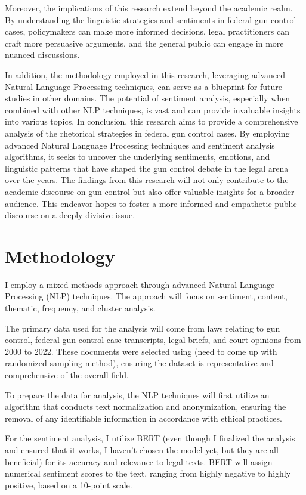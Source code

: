\documentclass[conference]{IEEEtran}
\begin{document}
Moreover, the implications of this research extend beyond the academic realm. By understanding the linguistic strategies and sentiments in federal gun control cases, policymakers can make more informed decisions, legal practitioners can craft more persuasive arguments, and the general public can engage in more nuanced discussions.

In addition, the methodology employed in this research, leveraging advanced Natural Language Processing techniques, can serve as a blueprint for future studies in other domains. The potential of sentiment analysis, especially when combined with other NLP techniques, is vast and can provide invaluable insights into various topics. In conclusion, this research aims to provide a comprehensive analysis of the rhetorical strategies in federal gun control cases. By employing advanced Natural Language Processing techniques and sentiment analysis algorithms, it seeks to uncover the underlying sentiments, emotions, and linguistic patterns that have shaped the gun control debate in the legal arena over the years. The findings from this research will not only contribute to the academic discourse on gun control but also offer valuable insights for a broader audience. This endeavor hopes to foster a more informed and empathetic public discourse on a deeply divisive issue.

\section{Methodology}
I employ a mixed-methods approach through advanced Natural Language Processing (NLP) techniques. The approach will focus on sentiment, content, thematic, frequency, and cluster analysis.

The primary data used for the analysis will come from laws relating to gun control, federal gun control case transcripts, legal briefs, and court opinions from 2000 to 2022. These documents were selected using (need to come up with randomized sampling method), ensuring the dataset is representative and comprehensive of the overall field.

To prepare the data for analysis, the NLP techniques will first utilize an algorithm that conducts text normalization and anonymization, ensuring the removal of any identifiable information in accordance with ethical practices.

For the sentiment analysis, I utilize BERT (even though I finalized the analysis and ensured that it works, I haven't chosen the model yet, but they are all beneficial) for its accuracy and relevance to legal texts. BERT will assign numerical sentiment scores to the text, ranging from highly negative to highly positive, based on a 10-point scale.
\end{document}
